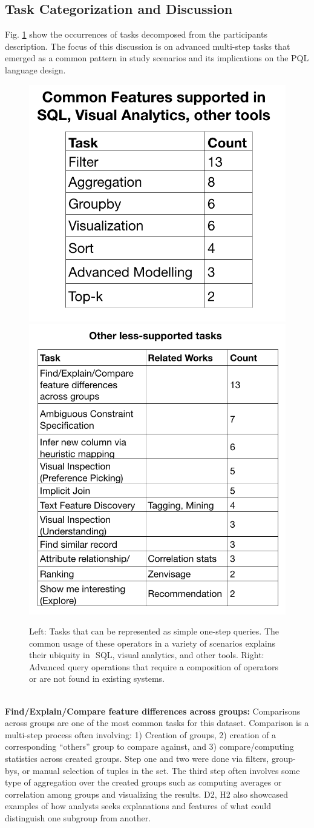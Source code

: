 \documentclass{sig-alternate-05-2015}
\begin{document}
\subsection{Task Categorization and Discussion}
Fig. \ref{tasks} show the occurrences of tasks decomposed from the participants description. The focus of this discussion is on advanced multi-step tasks that emerged as a common pattern in study scenarios and its implications on the PQL language design.
\begin{figure}[ht!]\label{tasks}
\includegraphics[width=0.5\linewidth]{figures/supported_tasks.png}
\includegraphics[width=0.5\linewidth]{figures/advanced_tasks.png}
\caption{Left: Tasks that can be represented as simple one-step queries. The common usage of these operators in a variety of scenarios explains their ubiquity in  SQL, visual analytics, and other tools. Right: Advanced query operations that require a composition of operators or are not found in existing systems. }
\end{figure}
\\ \textbf{Find/Explain/Compare feature differences across groups:}
Comparisons across groups are one of the most common tasks for this dataset. Comparison is a multi-step process often involving: 1) Creation of groups, 2) creation of a corresponding ``others'' group to compare against, and 3) compare/computing statistics across created groups. Step one and two were done via filters, group-bys, or manual selection of tuples in the set. The third step often involves some type of aggregation over the created groups such as computing averages or correlation among groups and visualizing the results. D2, H2 also showcased examples of how analysts seeks explanations and features of what could distinguish one subgroup from another. 
\end{document}
